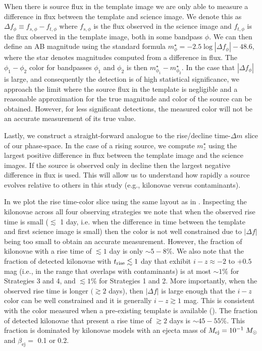 When there is source flux in the template image we are only able to measure a difference in flux between the template and science image. We denote this as $\Delta f_{\phi} \equiv f_{s,\phi} - f_{t,\phi}$ where $f_{s,\phi}$ is the flux observed in the science image and $f_{t,\phi}$ is the flux observed in the template image, both in some bandpass $\phi$. We can then define an AB magnitude using the standard formula $m^{\star}_{\phi} = -2.5\log{|\Delta f_{\phi}|}-48.6$, where the star denotes magnitudes computed from a difference in flux. The $\phi_1 - \phi_2$ color for bandpasses $\phi_1$ and $\phi_2$ is then $m^{\star}_{\phi_1} - m^{\star}_{\phi_2}$. In the case that $|\Delta f_{\phi}|$ is large, and consequently the detection is of high statistical significance,  we approach the limit where the source flux in the template is negligible and a reasonable approximation for the true magnitude and color of the source can be obtained. However, for less significant detections, the measured color will not be an accurate measurement of its true value.

\clearpage
Lastly, we construct a straight-forward analogue to the rise/decline time-$\Delta m$ slice of our phase-space. In the case of a rising source, we compute $m^{\star}_z$ using the largest positive difference in flux between the template image and the science images. If the source is observed only in decline then the largest negative difference in flux is used. This will allow us to understand how rapidly a source evolves relative to others in this study (e.g., kilonovae versus contaminants).

In  we plot the rise time-color slice using the same layout as in . Inspecting the kilonovae across all four observing strategies we note that when the observed rise time is small ($\lesssim$ 1 day, i.e. when the difference in time between the template and first science image is small) then the color is not well constrained due to $|\Delta f|$ being too small to obtain an accurate measurement. However, the fraction of kilonovae with a rise time of $\lesssim1$ day is only $\sim5-8\%$. We also note that the fraction of detected kilonovae with $t_{{\rm rise}} \lesssim 1$ day that exhibit $i-z\approx -2$ to $+0.5$ mag (i.e., in the range that overlaps with contaminants) is at most $\sim1\%$ for Strategies 3 and 4, and $\lesssim1\%$ for Strategies 1 and 2. More importantly, when the observed rise time is longer $(\gtrsim 2$ days), then $|\Delta f|$ is large enough that the $i-z$ color can be well constrained and it is generally $i-z\gtrsim1$ mag. This is consistent with the color measured when a pre-existing template is available (). The fraction of detected kilonovae that present a rise time of $\gtrsim 2$ days is $\sim45-55\%$. This fraction is dominated by kilonovae models with an ejecta mass of $M_{\rm ej} = 10^{-1} \;M_{\odot}$ and $\beta_{\text{ej}} = $ 0.1 or 0.2.

